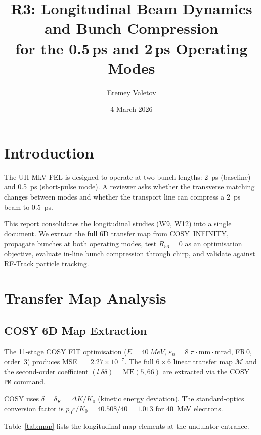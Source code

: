 \documentclass[11pt]{article}
\title{R3: Longitudinal Beam Dynamics and Bunch Compression\\
  for the 0.5\,ps and 2\,ps Operating Modes}
\author{Eremey Valetov}
\date{4 March 2026}
\begin{document}
\maketitle

\section{Introduction}

The UH MkV FEL is designed to operate at two bunch lengths: \SI{2}{ps}
(baseline) and \SI{0.5}{ps} (short-pulse mode).  A reviewer asks whether
the transverse matching changes between modes and whether the transport
line can compress a \SI{2}{ps} beam to \SI{0.5}{ps}.

This report consolidates the longitudinal studies (W9, W12) into a
single document.  We extract the full 6D transfer map from
COSY~INFINITY, propagate bunches at both operating modes, test
$R_{56} = 0$ as an optimisation objective, evaluate in-line bunch
compression through chirp, and validate against RF-Track particle
tracking.


\section{Transfer Map Analysis}

\subsection{COSY 6D Map Extraction}

The 11-stage COSY FIT optimisation ($E = \SI{40}{MeV}$,
$\varepsilon_n = 8\;\pi\cdot\text{mm}\cdot\text{mrad}$, FR\,0,
order~3) produces MSE~$= 2.27 \times 10^{-7}$.  The full $6\times6$
linear transfer map $\mathcal{M}$ and the second-order coefficient
$(l|\delta\delta) = \text{ME}(5,66)$ are extracted via the COSY
\texttt{PM} command.

COSY uses $\delta = \delta_K = \Delta K/K_0$ (kinetic energy
deviation).  The standard-optics conversion factor is
$p_0 c / K_0 = 40.508/40 = 1.013$ for \SI{40}{MeV} electrons.

Table~\ref{tab:map} lists the longitudinal map elements at the
undulator entrance.
\end{document}
